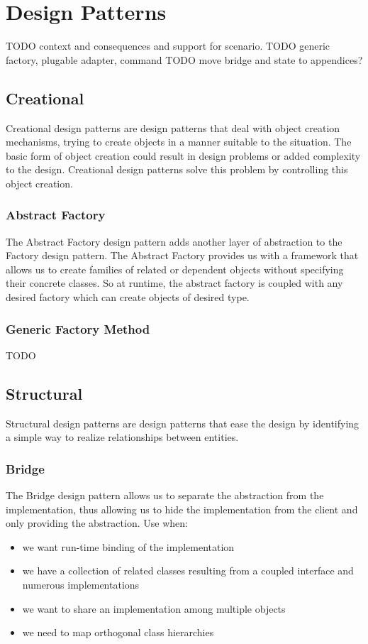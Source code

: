 \chapter{Design Patterns}
TODO context and consequences and support for scenario.
TODO generic factory, plugable adapter, command
TODO move bridge and state to appendices?

\section{Creational}
Creational design patterns are design patterns that deal with object creation
mechanisms, trying to create objects in a manner suitable to the situation. The basic form of object
creation could result in design problems or added complexity to the design. Creational design patterns
solve this problem by controlling this object creation.

\subsection{Abstract Factory}
The Abstract Factory design pattern adds another layer of abstraction to the Factory design pattern.
The Abstract Factory provides us with a framework that allows us to create families of related or
dependent objects without specifying their concrete classes. So at runtime, the abstract factory is
coupled with any desired factory which can create objects of desired type.

\subsection{Generic Factory Method}
TODO

\section{Structural}
Structural design patterns are design patterns that ease the design by identifying a simple way to
realize relationships between entities.

\subsection{Bridge}
The Bridge design pattern allows us to separate the abstraction from the implementation, thus
allowing us to hide the implementation from the client and only providing the abstraction.
Use when:
\begin{itemize}
	\item we want run-time binding of the implementation
	\item we have a collection of related classes resulting from a coupled interface and numerous
	      implementations
	\item we want to share an implementation among multiple objects
	\item we need to map orthogonal class hierarchies
\end{itemize}

